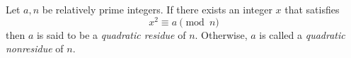\documentclass{article}
\begin{document}
Let $a,n$ be relatively prime integers. If there exists an integer $x$ that satisfies $$x^2 \equiv a \pmod{n}$$ then $a$ is said to be a \emph{quadratic residue} of $n$.  Otherwise, $a$ is called a \emph{quadratic nonresidue} of $n$.
\end{document}
